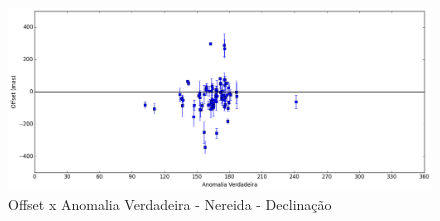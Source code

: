 \documentclass[11pt,a4paper]{report}
\begin{document}
\begin{figure}[h]
\caption{Offset x Anomalia Verdadeira - Nereida - Declinação}
\includegraphics[scale=0.45]{Nereida/DEC_anom.png}  
\end{figure}

\end{document}
